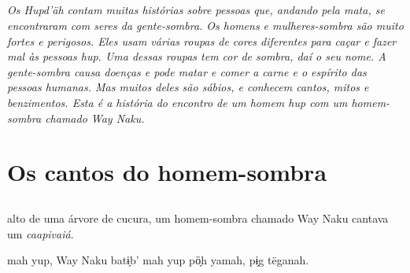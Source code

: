 \chapter*{}
\thispagestyle{empty}

\vspace*{\fill}
\textit{Os Hupd'äh contam muitas histórias sobre pessoas que, andando pela mata, se
encontraram com seres da gente-sombra. Os homens e mulheres-sombra são muito fortes e perigosos. Eles usam várias roupas de cores diferentes para caçar e fazer mal às pessoas hup. Uma dessas roupas tem cor de sombra, daí o seu nome. A gente-sombra causa doenças e pode matar e comer a carne e o espírito das pessoas humanas. Mas muitos deles são sábios, e conhecem cantos, mitos e benzimentos. Esta é a história do encontro de um homem hup com um homem-sombra chamado Way Naku.}
\vspace*{\fill}

\openany\raggedright

\blankpage
\part{Os cantos do homem-sombra}


\chapter*{}
\mbox{}\vspace*{\fill}

\begingroup\setlength{\linewidth}{.6\linewidth}


 alto de uma árvore de
cucura, um homem-sombra
chamado Way Naku cantava
um \textit{caapivaiá}.

\vspace{2em}

 mah yup, Way Naku
batɨ̗b’ mah yup pö̗h yamah,
pɨ̗g tëganah.

\vspace*{\fill}

